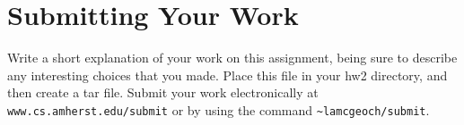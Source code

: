 \documentclass[11pt]{article}
\begin{document}
\section{Submitting Your Work}
Write a short explanation of your work on this assignment, being sure to describe any interesting choices that you made.  Place this file in your hw2 directory, and then create a tar file.  Submit your work electronically at \verb'www.cs.amherst.edu/submit' or by using the command \verb'~lamcgeoch/submit'.
\end{document}
